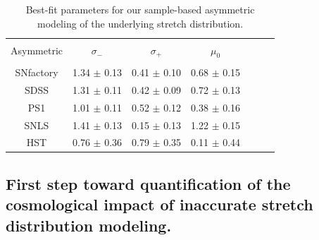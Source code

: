 \documentclass[]{aa} %
\begin{document}
\begin{table}
    \centering
    \caption{Best-fit parameters for our sample-based asymmetric modeling of the
    underlying stretch distribution.}
    \label{tab:bbc}
    \begin{tabular}{c c c c c c c}\hline\hline\\[-0.8em]
    Asymmetric & $\sigma_{-}$    & $\sigma_{+}$    & $\mu_0$ \\\hline\\[-0.8em]
    SNfactory  & 1.34 $\pm$ 0.13 & 0.41 $\pm$ 0.10 & 0.68 $\pm$ 0.15 \\[0.15em]
    SDSS       & 1.31 $\pm$ 0.11 & 0.42 $\pm$ 0.09 & 0.72 $\pm$ 0.13 \\[0.15em]
    PS1        & 1.01 $\pm$ 0.11 & 0.52 $\pm$ 0.12 & 0.38 $\pm$ 0.16 \\[0.15em]
    SNLS       & 1.41 $\pm$ 0.13 & 0.15 $\pm$ 0.13 & 1.22 $\pm$ 0.15 \\[0.15em]
    HST        & 0.76 $\pm$ 0.36 & 0.79 $\pm$ 0.35 & 0.11 $\pm$ 0.44 \\\hline
    \hline
    \end{tabular}
\end{table}

\subsection{First step toward quantification of the cosmological impact of
inaccurate stretch distribution modeling.}
\end{document}
